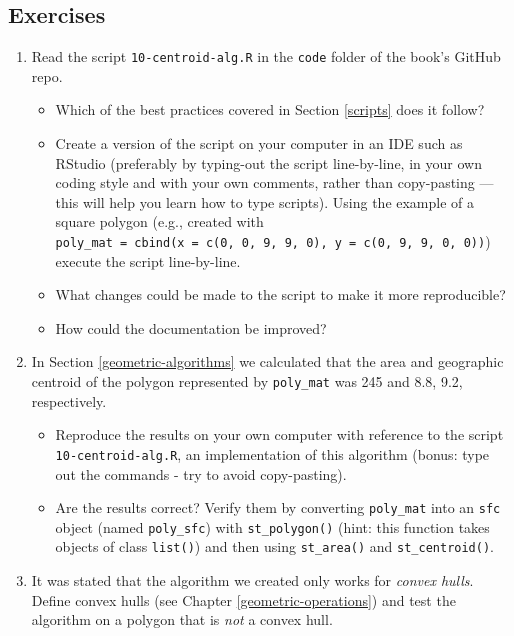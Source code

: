 \documentclass[]{krantz}
\providecommand{\tightlist}{%
  \setlength{\itemsep}{0pt}\setlength{\parskip}{0pt}}
\begin{document}
\hypertarget{ex-algorithms}{%
\subsection{Exercises}\label{ex-algorithms}}

\begin{enumerate}
\def\labelenumi{\arabic{enumi}.}
\tightlist
\item
  Read the script \texttt{10-centroid-alg.R} in the \texttt{code} folder of the book's GitHub repo.

  \begin{itemize}
  \tightlist
  \item
    Which of the best practices covered in Section \ref{scripts} does it follow?
  \item
    Create a version of the script on your computer in an IDE such as RStudio (preferably by typing-out the script line-by-line, in your own coding style and with your own comments, rather than copy-pasting --- this will help you learn how to type scripts). Using the example of a square polygon (e.g., created with \texttt{poly\_mat\ =\ cbind(x\ =\ c(0,\ 0,\ 9,\ 9,\ 0),\ y\ =\ c(0,\ 9,\ 9,\ 0,\ 0))}) execute the script line-by-line.
  \item
    What changes could be made to the script to make it more reproducible?
  \item
    How could the documentation be improved?
  \end{itemize}
\item
  In Section \ref{geometric-algorithms} we calculated that the area and geographic centroid of the polygon represented by \texttt{poly\_mat} was 245 and 8.8, 9.2, respectively.

  \begin{itemize}
  \tightlist
  \item
    Reproduce the results on your own computer with reference to the script \texttt{10-centroid-alg.R}, an implementation of this algorithm (bonus: type out the commands - try to avoid copy-pasting).
  \item
    Are the results correct? Verify them by converting \texttt{poly\_mat} into an \texttt{sfc} object (named \texttt{poly\_sfc}) with \texttt{st\_polygon()} (hint: this function takes objects of class \texttt{list()}) and then using \texttt{st\_area()} and \texttt{st\_centroid()}.
  \end{itemize}
\item
  It was stated that the algorithm we created only works for \emph{convex hulls}. Define convex hulls (see Chapter \ref{geometric-operations}) and test the algorithm on a polygon that is \emph{not} a convex hull.


\end{enumerate}
\end{document}
